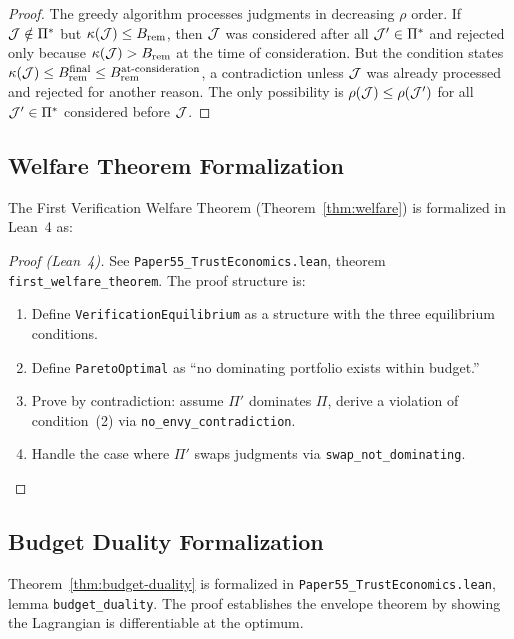 \documentclass[11pt]{article}
\newcommand{\VerifCost}{\kappa}
\newcommand{\TrustReturn}{\rho}
\begin{document}
\begin{proof}
The greedy algorithm processes judgments in decreasing $\TrustReturn$
order.  If $\mathcal{J} \notin \Pi^*$ but $\VerifCost(\J) \leq B_{\text{rem}}$,
then $\mathcal{J}$ was considered after all $\mathcal{J}' \in \Pi^*$ and rejected only
because $\VerifCost(\J) > B_{\text{rem}}$ at the time of consideration.
But the condition states $\VerifCost(\J) \leq B_{\text{rem}}^{\text{final}}
\leq B_{\text{rem}}^{\text{at-consideration}}$, a contradiction unless
$\mathcal{J}$ was already processed and rejected for another reason.  The only
possibility is $\TrustReturn(\J) \leq \TrustReturn(\J')$ for all
$\mathcal{J}' \in \Pi^*$ considered before $\mathcal{J}$.
\end{proof}

\subsection{Welfare Theorem Formalization}

\begin{theorem}\label{thm:welfare-formal}
The First Verification Welfare Theorem
(Theorem~\ref{thm:welfare}) is formalized in Lean~4 as:
\end{theorem}

\begin{proof}[Proof (Lean~4)]
See \texttt{Paper55\_TrustEconomics.lean}, theorem
\texttt{first\_welfare\_theorem}.  The proof structure is:
\begin{enumerate}[noitemsep]
  \item Define \texttt{VerificationEquilibrium} as a structure with
        the three equilibrium conditions.
  \item Define \texttt{ParetoOptimal} as ``no dominating portfolio
        exists within budget.''
  \item Prove by contradiction: assume $\Pi'$ dominates $\Pi$,
        derive a violation of condition~(2) via
        \texttt{no\_envy\_contradiction}.
  \item Handle the case where $\Pi'$ swaps judgments via
        \texttt{swap\_not\_dominating}.
\end{enumerate}
\end{proof}

\subsection{Budget Duality Formalization}

\begin{lemma}\label{lem:budget-dual-formal}
Theorem~\ref{thm:budget-duality} is formalized in
\texttt{Paper55\_TrustEconomics.lean}, lemma
\texttt{budget\_duality}.  The proof establishes the envelope theorem
by showing the Lagrangian is differentiable at the optimum.
\end{lemma}
\end{document}
